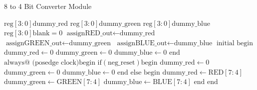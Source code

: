 \begin{algorithm}[H]
	\caption{8 to 4 Bit Converter Module \cite{fpgaipvgarepo}}
	\begin{algorithmic}[1]
		\State $\text{reg} [3:0] \text{dummy\_red}$
		\State $\text{reg} [3:0] \text{dummy\_green}$
		\State $\text{reg} [3:0] \text{dummy\_blue}$
		\State $\text{reg} [3:0] \text{blank} = 0$
		\State
		\State $\text{assign} \text{RED\_out} \gets \text{dummy\_red}$
		\State $\text{assign} \text{GREEN\_out} \gets \text{dummy\_green}$
		\State $\text{assign} \text{BLUE\_out} \gets \text{dummy\_blue}$
		\State
		\State $\text{initial begin}$
		\State \quad $\text{dummy\_red} \gets 0$
		\State \quad $\text{dummy\_green} \gets 0$
		\State \quad $\text{dummy\_blue} \gets 0$
		\State $\text{end}$
		\State
		\State $\text{always} \text{@ (posedge clock)} \text{begin}$
		\State \quad $\text{if} (\text{neg\_reset}) \text{begin}$
		\State \quad \quad $\text{dummy\_red} \gets 0$
		\State \quad \quad $\text{dummy\_green} \gets 0$
		\State \quad \quad $\text{dummy\_blue} \gets 0$
		\State \quad $\text{end}$
		\State \quad $\text{else} \text{ begin}$
		\State \quad \quad $\text{dummy\_red} \gets \text{RED}[7:4]$
		\State \quad \quad $\text{dummy\_green} \gets \text{GREEN}[7:4]$
		\State \quad \quad $\text{dummy\_blue} \gets \text{BLUE}[7:4]$
		\State \quad $\text{end}$
		\State $\text{end}$
		\EndProcedure
	\end{algorithmic}
\end{algorithm}

%

